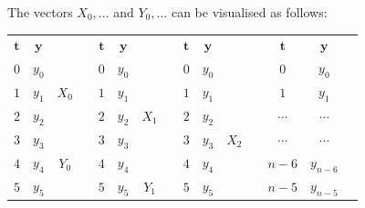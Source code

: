 \documentclass[11pt]{article}
\begin{document}
The vectors $X_0, \dots$ and $Y_0, \dots$ can be visualised as follows:
\begin{center}
  \begin{tabular}{|c|c|cc|c|c|cc|c|c|cc|c|c|c}
    \cline{1-2} \cline{5-6} \cline{9-10} \cline{13-14}
    $\mathbf{t}$ & $\mathbf{y}$                  &                &  & $\mathbf{t}$ & $\mathbf{y}$                  &                &  & $\mathbf{t}$ & $\mathbf{y}$                  &                &  & $\mathbf{t}$ & $\mathbf{y}$                      &                \\ \cline{1-2} \cline{5-6} \cline{9-10} \cline{13-14}
    $0$        & \cellcolor[HTML]{A2E4F6}$y_0$ &                &  & $0$        & $y_0$                         &                &  & $0$        & $y_0$                         &                &  & ${0}$   & $y_{0}$                        &                \\ \cline{1-2} \cline{5-6} \cline{9-10} \cline{13-14}
    $1$        & \cellcolor[HTML]{A2E4F6}$y_1$ & $X_0$ &  & $1$        & \cellcolor[HTML]{A2E4F6}$y_1$ &                &  & $1$        & $y_1$                         &                &  & ${1}$    & $y_{1}$                         &                \\ \cline{1-2} \cline{5-6} \cline{9-10} \cline{13-14}
    $2$        & \cellcolor[HTML]{A2E4F6}$y_2$ &                &  & $2$        & \cellcolor[HTML]{A2E4F6}$y_2$ & $X_1$ &  & $2$        & \cellcolor[HTML]{A2E4F6}$y_2$ &       &  & $\cdots$    & $\cdots$                         &       \\ \cline{1-2} \cline{5-6} \cline{9-10} \cline{13-14}
    $3$        & \cellcolor[HTML]{A2E4F6}$y_3$ &                &  & $3$        & \cellcolor[HTML]{A2E4F6}$y_3$ &                &  & $3$        & \cellcolor[HTML]{A2E4F6}$y_3$ & $X_2$ &  & $\cdots$    & $\cdots$                         &       \\ \cline{1-2} \cline{5-6} \cline{9-10} \cline{13-14}
    $4$        & \cellcolor[HTML]{EB7D7D}$y_4$ & $Y_0$ &  & $4$        & \cellcolor[HTML]{A2E4F6}$y_4$ &                &  & $4$        & \cellcolor[HTML]{A2E4F6}$y_4$ &                &  & ${n-6}$    & $y_{n-6}$                         &                \\ \cline{1-2} \cline{5-6} \cline{9-10} \cline{13-14}
    $5$        & \cellcolor[HTML]{EB7D7D}$y_5$ &                &  & $5$        & \cellcolor[HTML]{EB7D7D}$y_5$ & $Y_1$ &  & $5$        & \cellcolor[HTML]{A2E4F6}$y_5$ &       &  & ${n-5}$    & \cellcolor[HTML]{A2E4F6}$y_{n-5}$ &       \\ \cline{1-2} \cline{5-6} \cline{9-10} \cline{13-14}

\end{tabular}
\end{center}
\end{document}
